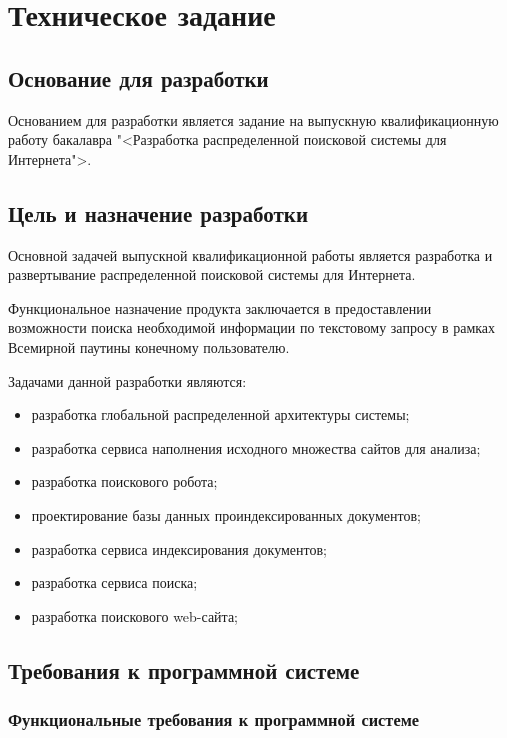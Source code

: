 \section{Техническое задание}
\subsection{Основание для разработки}

Основанием для разработки является задание на выпускную квалификационную работу бакалавра "<Разработка распределенной поисковой системы для Интернета">.

\subsection{Цель и назначение разработки}

Основной задачей выпускной квалификационной работы является разработка и развертывание распределенной поисковой системы для Интернета.

Функциональное назначение продукта заключается в предоставлении возможности поиска необходимой информации по текстовому запросу в рамках Всемирной паутины конечному пользователю.

Задачами данной разработки являются:
\begin{itemize}
\item разработка глобальной распределенной архитектуры системы;
\item разработка сервиса наполнения исходного множества сайтов для анализа;
\item разработка поискового робота;
\item проектирование базы данных проиндексированных документов;
\item разработка сервиса индексирования документов;
\item разработка сервиса поиска;
\item разработка поискового web-сайта;
\end{itemize}

\subsection{Требования к программной системе}

\subsubsection{Функциональные требования к программной системе}

